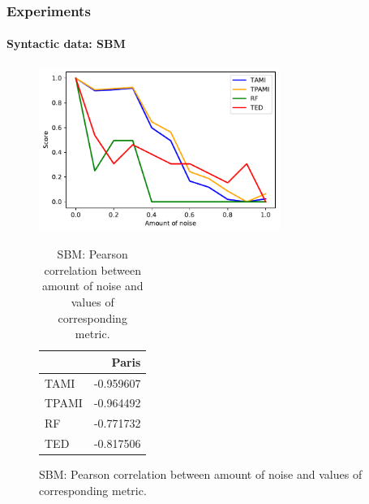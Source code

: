 \documentclass{tum-presentation}
\begin{document}
\begin{frame} 
	\frametitle{Experiments}
	\framesubtitle{Syntactic data: SBM}
	\begin{figure}[H]
		\centering
		\begin{minipage}{.6\textwidth}
			\begin{center}
				\includegraphics[width=0.7\textwidth]{../figures/2-block-model-sbm-Paris.pdf}			
				\caption{Similarity results on the Paris dendrogram.}
			\end{center}
		\end{minipage}%
		\begin{minipage}{0.4\textwidth}
			\begin{table}
				\centering
				\caption{SBM: Pearson correlation between amount of noise and values of corresponding metric.}
				\begin{tabular}{lr}
					\toprule
					{} &    Paris  \\
					\midrule
						TAMI  & -0.959607 \\
						TPAMI & -0.964492 \\
						RF    & -0.771732 \\
						TED   & -0.817506 \\
					\bottomrule
				\end{tabular}
			\end{table}
		\end{minipage}
	\end{figure}
\end{frame}
\end{document}
